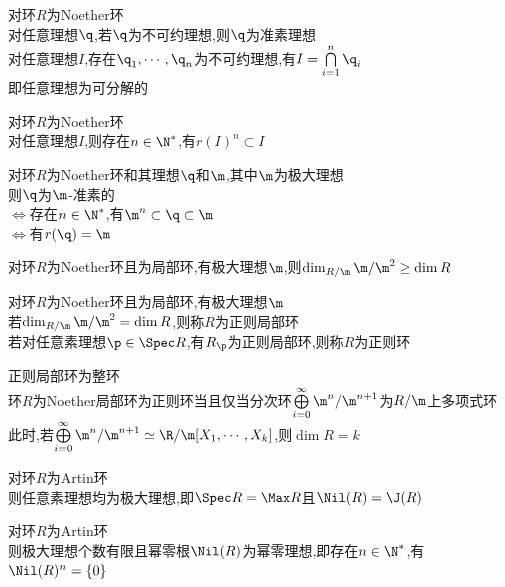 \begin{dingli}
对环$R$为Noether环\\
对任意理想$\q$,若$\q$为不可约理想,则$\q$为准素理想\\
对任意理想$I$,存在$\q_1,\cdots,\q_n$为不可约理想,有$I=\bigcap\limits_{i=1}^{n}\q_i$\\
即任意理想为可分解的
\end{dingli}

\begin{dingli}
对环$R$为Noether环\\
对任意理想$I$,则存在$n\in \N^*$,有$r(I)^n\subset I$
\end{dingli}

\begin{dingli}
对环$R$为Noether环和其理想$\q$和$\m$,其中$\m$为极大理想\\
则$\q$为$\m$-准素的\\
$\Leftrightarrow$存在$n\in\N^*$,有$\m^n\subset \q\subset \m$\\
$\Leftrightarrow$有$r(\q)=\m$
\end{dingli}

\begin{dingli}
对环$R$为Noether环且为局部环,有极大理想$\m$,则$\dim_{R/\m}\m/\m^2\geq\dim R$
\end{dingli}

\begin{dingyi}
对环$R$为Noether环且为局部环,有极大理想$\m$\\
若$\dim_{R/\m}\m/\m^2=\dim R$,则称$R$为正则局部环\\
若对任意素理想$\p\in \Spec R$,有$R_{\p}$为正则局部环,则称$R$为正则环
\end{dingyi}

\begin{zhu}
正则局部环为整环\\
环$R$为Noether局部环为正则环当且仅当分次环$\bigoplus\limits_{i=0}^{\infty}\m^n/\m^{n+1}$为$R/\m$上多项式环\\
此时,若$\bigoplus\limits_{i=0}^{\infty}\m^n/\m^{n+1}\simeq\R/\m[X_1,\cdots,X_k]$,则$\dim R=k$
\end{zhu}

\begin{dingli}
对环$R$为Artin环\\
则任意素理想均为极大理想,即$\Spec R=\Max R$且$\Nil(R)=\J(R)$
\end{dingli}

\begin{dingli}
对环$R$为Artin环\\
则极大理想个数有限且幂零根$\Nil(R)$为幂零理想,即存在$n\in\N^*$,有$\Nil(R)^n=\{0\}$
\end{dingli}

